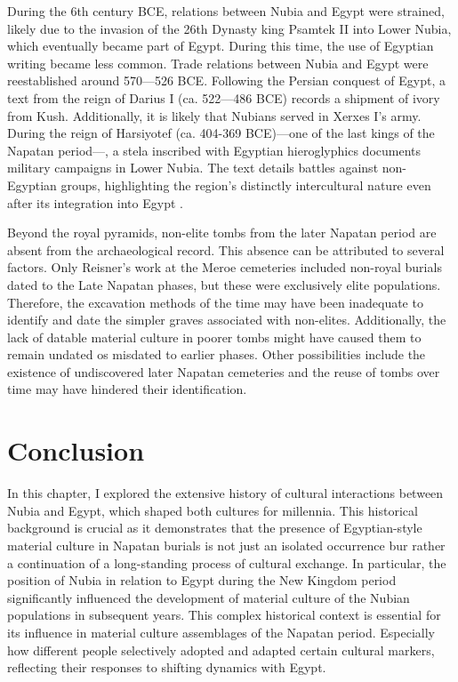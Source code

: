 During the 6th century BCE, relations between Nubia and Egypt were strained, likely due to the invasion of the 26th Dynasty king Psamtek II into Lower Nubia, which eventually became part of Egypt. During this time, the use of Egyptian writing became less common. Trade relations between Nubia and Egypt were reestablished around 570—526 BCE. Following the Persian conquest of Egypt, a text from the reign of Darius I (ca. 522—486 BCE) records a shipment of ivory from Kush. Additionally, it is likely that Nubians served in Xerxes I’s army. During the reign of Harsiyotef (ca. 404-369 BCE)—one of the last kings of the Napatan period—, a stela inscribed with Egyptian hieroglyphics documents military campaigns in Lower Nubia. The text details battles against non-Egyptian groups, highlighting the region's distinctly intercultural nature even after its integration into Egypt \parencites[p.~344-345, 344-345, 376-377]{torokKingdomKushHandbook1997}[p.~361-370]{torokTwoWorldsFrontier2009}[p.~498-499]{howleyKushitesEgypt6642020}.

Beyond the royal pyramids, non-elite tombs from the later Napatan period are absent from the archaeological record. This absence can be attributed to several factors. Only Reisner’s work at the Meroe cemeteries included non-royal burials dated to the Late Napatan phases, but these were exclusively elite populations. Therefore, the excavation methods of the time may have been inadequate to identify and date the simpler graves associated with non-elites. Additionally, the lack of datable material culture in poorer tombs might have caused them to remain undated os misdated to earlier phases. Other possibilities include the existence of undiscovered later Napatan cemeteries and the reuse of tombs over time may have hindered their identification.

\section{Conclusion}

In this chapter, I explored the extensive history of cultural interactions between Nubia and Egypt, which shaped both cultures for millennia. This historical background is crucial as it demonstrates that the presence of Egyptian-style material culture in Napatan burials is not just an isolated occurrence bur rather a continuation of a long-standing process of cultural exchange. In particular, the position of Nubia in relation to Egypt during the New Kingdom period significantly influenced the development of material culture of the Nubian populations in subsequent years. This complex historical context is essential for its influence in material culture assemblages of the Napatan period. Especially how different people selectively adopted and adapted certain cultural markers, reflecting their responses to shifting dynamics with Egypt.

